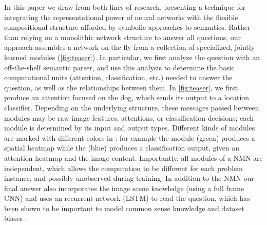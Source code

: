 In this paper we draw from both lines of research, presenting a technique for
integrating the representational power of neural networks with the flexible
compositional structure afforded by symbolic approaches to semantics.  Rather
than relying on a monolithic network structure to answer all questions, our
approach assembles a network on the fly from a collection of specialized,
jointly-learned modules (\autoref{fig:teaser}). In particular, we first analyze
the question with an off-the-shelf semantic parser, and use this analysis to
determine the basic computational units (attention, classification, etc.) needed
to answer the question, as well as the relationships between them. In
\autoref{fig:teaser}, we first produce an attention focused on the dog, which sends its output to
a location classifier. Depending on the underlying structure, these messages
passed between modules may be raw image features, attentions, or classification
decisions; each module is determined by its input and output types.
Different kinds of modules are marked with different
colors in : for example the  module
(green) produces a spatial heatmap while the  (blue)
produces a classification output, given an attention heatmap and the image
content. Importantly, all modules of a NMN are independent, which allows the
computation to be different for each problem instance, and possibly unobserved
during training. 
In addition to the NMN our final answer also incorporates the image scene
knowledge (using a full frame CNN) and uses an  recurrent network (LSTM) to read
the question, which has been shown to be important to model common sense
knowledge and dataset biases \cite{malinowski15iccv}.






